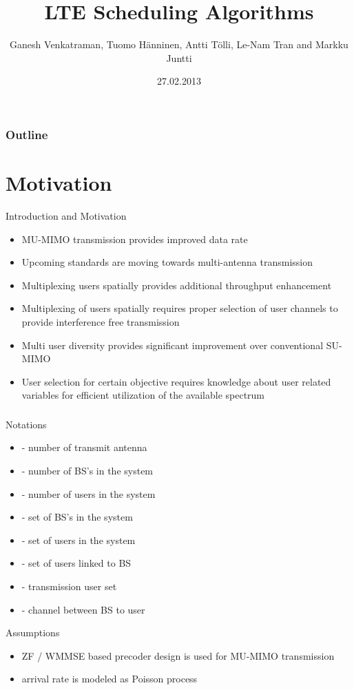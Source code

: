 \documentclass{beamer}
\title{\alert{LTE Scheduling Algorithms}}
\author{Ganesh Venkatraman, Tuomo H\"anninen, Antti T\"olli, Le-Nam Tran and Markku Juntti}
\institute{Center for Wireless Communications, DCE, University of Oulu \\ Oulu, Finland 90570}
\date{27.02.2013}
\begin{document}


\begin{frame}
\titlepage
\end{frame}

\begin{frame}
\frametitle{Outline}
\tableofcontents
\end{frame}

\section{Motivation}

\begin{frame}{Introduction and Motivation}
\begin{itemize}
  \item MU-MIMO transmission provides improved data rate
  \item Upcoming standards are moving towards multi-antenna transmission
  \item Multiplexing users spatially provides additional throughput enhancement
  \item Multiplexing of users spatially requires proper selection of user channels to provide interference free transmission
  \item Multi user diversity provides significant improvement over conventional SU-MIMO
  \item User selection for certain objective requires knowledge about user related variables for efficient utilization of the available spectrum
\end{itemize}
\end{frame}

\begin{frame}
\frametitle{}
\begin{block}{Notations}
\begin{itemize}
  \item {} - number of transmit antenna
  \item {} - number of BS's in the system
  \item {} - number of users in the system
  \item {} - set of BS's in the system
  \item {} - set of users in the system
  \item {} - set of users linked to BS 
  \item {} - transmission user set
  \item {} - channel between BS  to user 
\end{itemize}
\end{block}
\begin{block}{Assumptions}
\begin{itemize}
  \item ZF / WMMSE based precoder design is used for MU-MIMO transmission \cite{wiesel2008zero,wmmse_shi}
  \item \me{\lambda} arrival rate is modeled as Poisson process
\end{itemize}
\end{block}
\end{frame}
\end{document}
